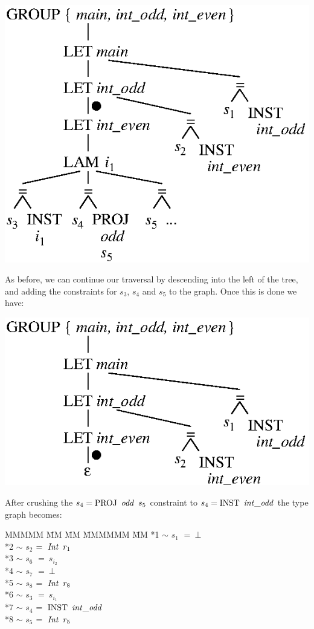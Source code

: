 \clearpage{}
\begin{center}
\includegraphics{3-Inference/fig/ordering/tree-intodd-gen-moved}
\end{center}
\vspace{-1em}
As before, we can continue our traversal by descending into the left of the tree, and adding the constraints for $s_3$, $s_4$ and $s_5$ to the graph. Once this is done we have:
\begin{center}
\includegraphics{3-Inference/fig/ordering/tree-inteven-gen}
\end{center}
After crushing the $s_4 = \rPROJ \ \iodd \ s_5$ constraint to $s_4 = \rINST \ \iintOdd$ the type graph becomes:
\begin{tabbing}
MMMMM	\= MM 	\= MM 		\= MMMMMM 	\= MM \kill
	\> *1	\> $\sim$	\> $s_1$	\> $= \ \bot$ \\
	\> *2	\> $\sim$	\> $s_2$	\> $= \ \operatorname{\mathit{Int}}  \ r_1$ \\
	\> *3	\> $\sim$	\> $s_6$	\> $= \ s_{i_2}$ \\
	\> *4	\> $\sim$	\> $s_7$	\> $= \ \bot$ \\
	\> *5	\> $\sim$	\> $s_8$	\> $= \ \operatorname{\mathit{Int}} \ r_8$ \\
	\> *6	\> $\sim$	\> $s_3$	\> $= \ s_{i_1}$ \\
	\> *7	\> $\sim$	\> $s_4$	\> $= \ \textrm{INST} \ \operatorname{\mathit{int\_odd}}$ \\
	\> *8	\> $\sim$	\> $s_5$	\> $= \ \operatorname{\mathit{Int}} \ r_5$ 
\end{tabbing}
